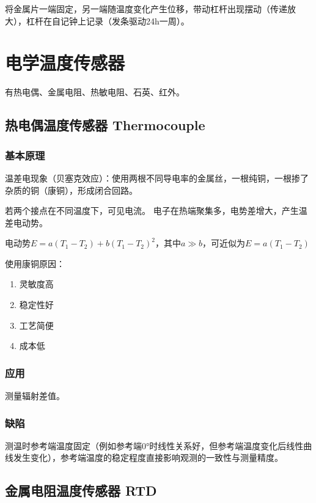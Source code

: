 \documentclass[UTF8,11pt]{ctexbook}
\begin{document}
将金属片一端固定，另一端随温度变化产生位移，带动杠杆出现摆动（传递放大），杠杆在自记钟上记录（发条驱动24h一周）。

\section{电学温度传感器}

有热电偶、金属电阻、热敏电阻、石英、红外。

\subsection{热电偶温度传感器 Thermocouple}

\subsubsection{基本原理}

温差电现象（贝塞克效应）：使用两根不同导电率的金属丝，一根纯铜，一根掺了杂质的铜（康铜），形成闭合回路。

若两个接点在不同温度下，可见电流。 电子在热端聚集多，电势差增大，产生温差电动势。

电动势\(E=a(T_1-T_2)+b(T_1-T_2)^2\)，其中\(a\gg b\)，可近似为\(E=a(T_1-T_2)\)

使用康铜原因：
\begin{enumerate}
    \item 灵敏度高
    \item 稳定性好
    \item 工艺简便
    \item 成本低
\end{enumerate}

\subsubsection{应用}

测量辐射差值。

\subsubsection{缺陷}

测温时参考端温度固定（例如参考端0°时线性关系好，但参考端温度变化后线性曲线发生变化），参考端温度的稳定程度直接影响观测的一致性与测量精度。

\subsection{金属电阻温度传感器 RTD}
\end{document}
